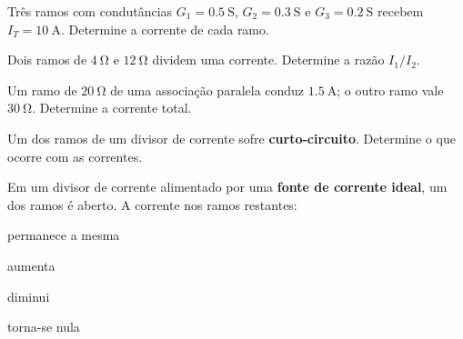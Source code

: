 \blocofixacao
\begin{questao}[1]{}

Três ramos com condutâncias $G_1=\SI{0.5}{\ensuremath{\mathrm{S}}}$,
$G_2=\SI{0.3}{\ensuremath{\mathrm{S}}}$ e $G_3=\SI{0.2}{\ensuremath{\mathrm{S}}}$ recebem
$I_T=\SI{10}{\ampere}$. Determine a corrente de cada ramo.


\end{questao}
\begin{questao}[1]{}

Dois ramos de $\SI{4}{\ohm}$ e $\SI{12}{\ohm}$ dividem uma corrente. Determine
a razão $I_1/I_2$.


\end{questao}
\begin{questao}[1]{}

Um ramo de $\SI{20}{\ohm}$ de uma associação paralela conduz
$\SI{1.5}{\ampere}$; o outro ramo vale $\SI{30}{\ohm}$. Determine a corrente
total.


\end{questao}
\begin{questao}[1]{}

Um dos ramos de um divisor de corrente sofre \textbf{curto-circuito}. Determine
o que ocorre com as correntes.


\end{questao}
\begin{questao}[1]{}

Em um divisor de corrente alimentado por uma \textbf{fonte de corrente ideal},
um dos ramos é aberto. A corrente nos ramos restantes:
\begin{alternativas}[2]
\item permanece a mesma
\item aumenta
\item diminui
\item torna-se nula
\end{alternativas}


\end{questao}


